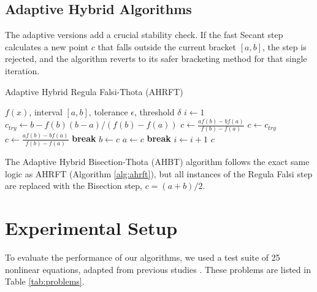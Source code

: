 \documentclass[reprint, amsmath, amssymb, aps, prl]{revtex4-2}
\begin{document}
\subsection{Adaptive Hybrid Algorithms}
The adaptive versions add a crucial stability check. If the fast Secant step calculates a new point $c$ that falls outside the current bracket $[a, b]$, the step is rejected, and the algorithm reverts to its safer bracketing method for that single iteration.

\begin{algorithm}[H]
\caption{Adaptive Hybrid Regula Falsi-Thota (AHRFT)}
\label{alg:ahrft}
\begin{algorithmic}[1]
\Require $f(x)$, interval $[a, b]$, tolerance $\epsilon$, threshold $\delta$
\State $i \leftarrow 1$
\Loop
        \State $c_{try} \leftarrow b - f(b)(b-a) / (f(b)-f(a))$
         
            \State $c \leftarrow \frac{a f(b) - b f(a)}{f(b) - f(a)}$ 
        \Else
            \State $c \leftarrow c_{try}$ 
        \EndIf
    \Else
        \State $c \leftarrow \frac{a f(b) - b f(a)}{f(b) - f(a)}$ 
    \EndIf
        \State \textbf{break}
    \EndIf
        \State $b \leftarrow c$
    \Else
        \State $a \leftarrow c$
    \EndIf
        \State \textbf{break}
    \EndIf
    \State $i \leftarrow i + 1$
\EndLoop
\State \Return $c$
\end{algorithmic}
\end{algorithm}

The Adaptive Hybrid Bisection-Thota (AHBT) algorithm follows the exact same logic as AHRFT (Algorithm \ref{alg:ahrft}), but all instances of the Regula Falsi step are replaced with the Bisection step, $c = (a+b)/2$.

\section{Experimental Setup}
To evaluate the performance of our algorithms, we used a test suite of 25 nonlinear equations, adapted from previous studies \cite{hasan2016numerical, hasan2015comparative}. These problems are listed in Table \ref{tab:problems}.
\end{document}
